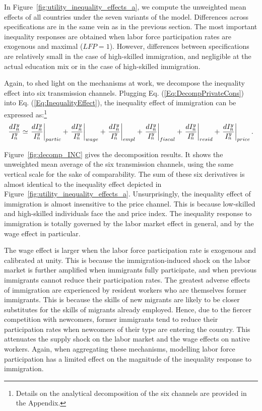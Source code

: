 \documentclass[a4paper,12pt]{article}
\begin{document}
In Figure~\ref{fig:utility_inequality_effects_a}, we compute the unweighted mean effects of all countries under the seven variants of the model. Differences across specifications are in the same vein as in the previous section. The most important inequality responses are obtained when labor force participation rates are exogenous and maximal ($LFP=1$). However, differences between specifications are relatively small in the case of high-skilled immigration, and negligible at the actual education mix or in the case of high-skilled immigration.

Again, to shed light on the mechanisms at work, we decompose the inequality effect into six transmission channels. Plugging Eq. (\ref{Eq:DecompPrivateCons}) into Eq. (\ref{Eq:InequalityEffect}), the inequality effect of immigration can be expressed as:\footnote{Details on the analytical decomposition of the six channels are provided in the Appendix.}
\begin{equation}
\frac{dI_{n}^{y}}{I_{n}^{y}}\simeq \left. \frac{dI_{n}^{y}}{I_{n}^{y}}%
\right \vert _{partic}+\left. \frac{dI_{n}^{y}}{I_{n}^{y}}\right \vert
_{wage}+\left. \frac{dI_{n}^{y}}{I_{n}^{y}}\right \vert _{empl}+\left. \frac{%
dI_{n}^{y}}{I_{n}^{y}}\right \vert _{fiscal}+\left. \frac{dI_{n}^{y}}{%
I_{n}^{y}}\right \vert _{resid}+\left. \frac{dI_{n}^{y}}{I_{n}^{y}}%
\right \vert _{price}. \label{Eq:DecompIneq}
\end{equation}

Figure~\ref{fig:decomp_INC} gives the decomposition results. It shows the unweighted mean average of the six transmission channels, using the same vertical scale for the sake of comparability. The sum of these six derivatives is almost identical to the inequality effect depicted in Figure~\ref{fig:utility_inequality_effects_a}. Unsurprisingly, the inequality effect of immigration is almost insensitive to the price channel. This is because low-skilled and high-skilled individuals face the and price index. The inequality response to immigration is totally governed by the labor market effect in general, and by the wage effect in particular.

The wage effect is larger when the labor force participation rate is exogenous and calibrated at unity. This is because the immigration-induced shock on the labor market is further amplified when immigrants fully participate, and when previous immigrants cannot reduce their participation rates. The greatest adverse effects of immigration are experienced by resident workers who are themselves former immigrants. This is because the skills of new migrants are likely to be closer substitutes for the skills of migrants already employed. Hence, due to the fiercer competition with newcomers, former immigrants tend to reduce their participation rates when newcomers of their type are entering the country. This attenuates the supply shock on the labor market and the wage effects on native workers. Again, when aggregating these mechanisms, modelling labor force participation has a limited effect on the magnitude of the inequality response to immigration.
\end{document}
